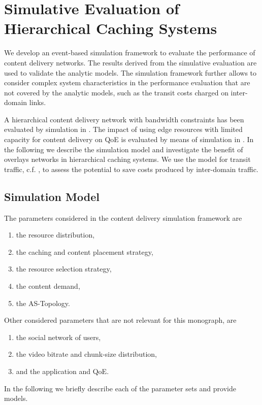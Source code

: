 \section{Simulative Evaluation of Hierarchical Caching Systems}\label{sec:hierarchical:simulative:simulative}

We develop an event-based simulation framework to evaluate the performance of content delivery networks.
The results derived from the simulative evaluation are used to validate the analytic models.
The simulation framework further allows to consider complex system characteristics in the performance evaluation that are not covered by the analytic models, such as the transit costs charged on inter-domain links.

A hierarchical content delivery network with bandwidth constraints has been evaluated by simulation in \cite{applegate2010optimal}.
The impact of using edge resources with limited capacity for content delivery on QoE is evaluated by means of simulation in \cite{info3-inproceedings-2015-530}.
In the following we describe the simulation model and investigate the benefit of overlays networks in hierarchical caching systems.
We use the model for transit traffic, c.f. , to assess the potential to save costs produced by inter-domain traffic.

\subsection{Simulation Model}\label{sec:simeval}

The parameters considered in the content delivery simulation framework are
\begin{enumerate}
  \itemsep0em
  \item the resource distribution,
  \item the caching and content placement strategy,
  \item the resource selection strategy,
  \item the content demand,
  \item the AS-Topology.
\end{enumerate}
Other considered parameters that are not relevant for this monograph, are
\begin{enumerate}
  \itemsep0em
  \item the social network of users,
  \item the video bitrate and chunk-size distribution,
  \item and the application and QoE.
\end{enumerate}
In the following we briefly describe each of the parameter sets and provide models.

